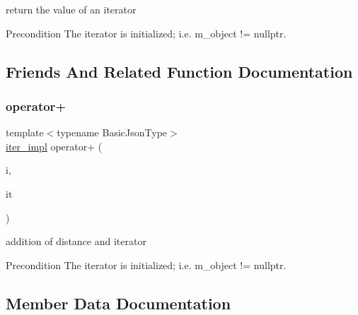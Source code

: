 return the value of an iterator 

\begin{DoxyPrecond}{Precondition}
The iterator is initialized; i.\+e. {\ttfamily m\+\_\+object != nullptr}. 
\end{DoxyPrecond}


\subsection{Friends And Related Function Documentation}
\mbox{\label{classnlohmann_1_1detail_1_1iter__impl_a94108d1a7563e103534f23eb5c1ee175}} 
\subsubsection{\texorpdfstring{operator+}{operator+}}
{\footnotesize\ttfamily template$<$typename Basic\+Json\+Type$>$ \\
\hyperlink{classnlohmann_1_1detail_1_1iter__impl}{iter\+\_\+impl} operator+ (\begin{DoxyParamCaption}\item[{\hyperlink{classnlohmann_1_1detail_1_1iter__impl_a2f7ea9f7022850809c60fc3263775840}{difference\+\_\+type}}]{i,  }\item[{const \hyperlink{classnlohmann_1_1detail_1_1iter__impl}{iter\+\_\+impl}$<$ \hyperlink{classnlohmann_1_1detail_1_1iter__impl_abf18f18793f84b0222aebb5a2a87da7a}{Basic\+Json\+Type} $>$ \&}]{it }\end{DoxyParamCaption})\hspace{0.3cm}{\ttfamily [friend]}}



addition of distance and iterator 

\begin{DoxyPrecond}{Precondition}
The iterator is initialized; i.\+e. {\ttfamily m\+\_\+object != nullptr}. 
\end{DoxyPrecond}


\subsection{Member Data Documentation}
\mbox{\label{classnlohmann_1_1detail_1_1iter__impl_abf18f18793f84b0222aebb5a2a87da7a}} 
